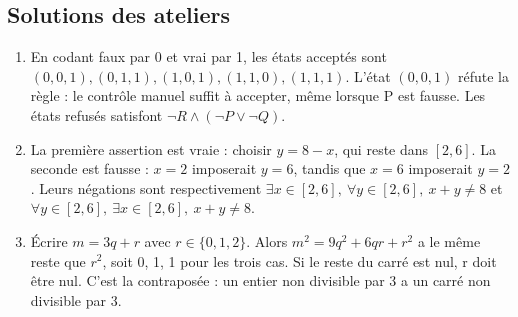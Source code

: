 \subsection{Solutions des ateliers}
\begin{enumerate}
\item En codant faux par 0 et vrai par 1, les états acceptés sont $(0, 0, 1), (0, 1, 1), (1, 0, 1), (1, 1, 0), (1, 1, 1)$. L'état $(0,0,1)$ réfute la règle : le contrôle manuel suffit à accepter, même lorsque P est fausse. Les états refusés satisfont $\neg R\wedge(\neg P\vee\neg Q)$.
\item La première assertion est vraie : choisir $y=8-x$, qui reste dans $[2,6]$. La seconde est fausse : $x=2$ imposerait $y=6$, tandis que $x=6$ imposerait $y=2$. Leurs négations sont respectivement $\exists x\in[2,6],\ \forall y\in[2,6],\ x+y\ne8$ et $\forall y\in[2,6],\ \exists x\in[2,6],\ x+y\ne8$.
\item Écrire $m=3q+r$ avec $r\in\{0,1,2\}$. Alors $m^2=9q^2+6qr+r^2$ a le même reste que $r^2$, soit 0, 1, 1 pour les trois cas. Si le reste du carré est nul, r doit être nul. C'est la contraposée : un entier non divisible par 3 a un carré non divisible par 3.
\end{enumerate}
